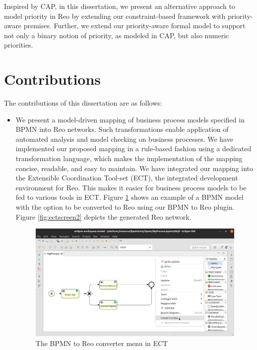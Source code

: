Inspired by CAP, in this dissertation, we present an alternative approach to model priority in Reo by extending our constraint-based framework with priority-aware premises. Further, we extend our priority-aware formal model to support not only a binary notion of priority, as modeled in CAP, but also numeric priorities. %

\section{Contributions}

The contributions of this dissertation are as follows:

\begin{itemize}
\item We present a model-driven mapping of business process models specified in BPMN into Reo networks. Such transformations enable application of automated analysis and model checking on business processes. We have implemented our proposed mapping in a rule-based fashion using a dedicated transformation language, which makes the implementation of the mapping concise, readable, and easy to maintain. We have integrated our mapping into the Extensible Coordination Tool-set (ECT), the integrated development environment for Reo. This makes it easier for business process models to be fed to various tools in ECT. Figure \ref{fig:ectscreen} shows an example of a BPMN model with the option to be converted to Reo using our BPMN to Reo plugin. Figure \ref{fig:ectscreen2} depicts the generated Reo network.

\begin{figure}[!t]
\includegraphics[width=.9\textwidth]{img/ectlast}
\caption{The BPMN to Reo converter menu in ECT}
\label{fig:ectscreen}
\end{figure}



\end{itemize}
